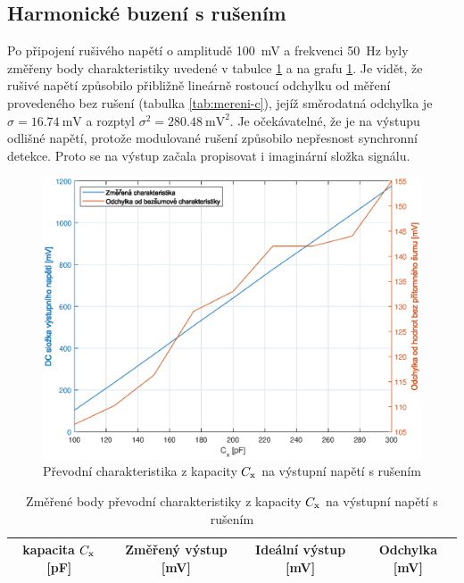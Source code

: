 \documentclass[twoside]{article}
\newcommand{\Cx}{C_{\rm x}}
\begin{document}
\clearpage
\subsection{Harmonické buzení s rušením}

Po připojení rušivého napětí o amplitudě \SI{100}{\milli\volt} a frekvenci \SI{50}{\hertz}
byly změřeny body charakteristiky uvedené v tabulce \ref{tab:mereni-c-noise}
a na grafu \ref{fig:mereni-c-noise}. 
Je vidět, že rušivé napětí způsobilo
přibližně lineárně rostoucí odchylku od měření provedeného bez rušení (tabulka \ref{tab:mereni-c}),
jejíž směrodatná odchylka je $\sigma = \SI{16.74}{\milli\volt}$ a rozptyl
$\sigma^2 = \SI{280.48}{\milli\volt\squared}$.
Je očekávatelné, že je na výstupu odlišné napětí, protože modulované rušení
způsobilo nepřesnost synchronní detekce. Proto se na výstup začala propisovat
i imaginární složka signálu.

\begin{figure}[h]
    \centering
    \includegraphics[width=\textwidth]{mereni-c-noise.eps}
    \caption{Převodní charakteristika z kapacity $\Cx$ na výstupní napětí s rušením}
    \label{fig:mereni-c-noise}
\end{figure}

\begin{table}[h]
    \centering
    \begin{tabular}{c|c|c|c}
        kapacita $\Cx$ [pF] & Změřený výstup [mV] & Ideální výstup [mV] & Odchylka [mV] \\\hline
      
    \end{tabular}
    \caption{Změřené body převodní charakteristiky z kapacity $\Cx$ na výstupní napětí s rušením}
    \label{tab:mereni-c-noise}
\end{table}
\end{document}
